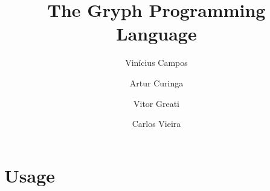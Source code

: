 \documentclass{article}
\title{The Gryph Programming Language}
\author{Vinícius Campos \and Artur Curinga \and Vitor Greati \and Carlos Vieira}
\begin{document}
\maketitle

\tableofcontents



\section{Usage}
\label{sec:usage}







\end{document}
